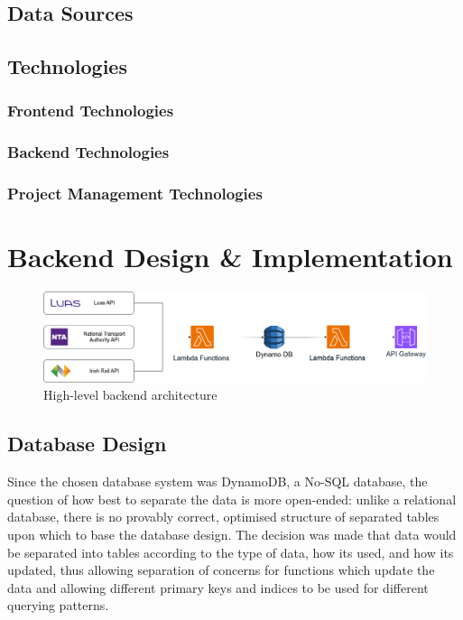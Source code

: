 \documentclass[a4paper,11pt]{report}
\begin{document}
\section{Data Sources}
\section{Technologies}
\subsection{Frontend Technologies}
\subsection{Backend Technologies}
\subsection{Project Management Technologies}

\chapter{Backend Design \& Implementation}
\begin{figure}[H]
    \centering
    \includegraphics[width=\textwidth]{./images/overall_backend.png}
    \caption{High-level backend architecture}
\end{figure}

\section{Database Design}
Since the chosen database system was DynamoDB, a No-SQL database, the question of how best to separate the data is more open-ended: unlike a relational database, there is no provably correct, optimised structure of separated tables upon which to base the database design.
The decision was made that data would be separated into tables according to the type of data, how its used, and how its updated, thus allowing separation of concerns for functions which update the data and allowing different primary keys and indices to be used for different querying patterns.
\end{document}
